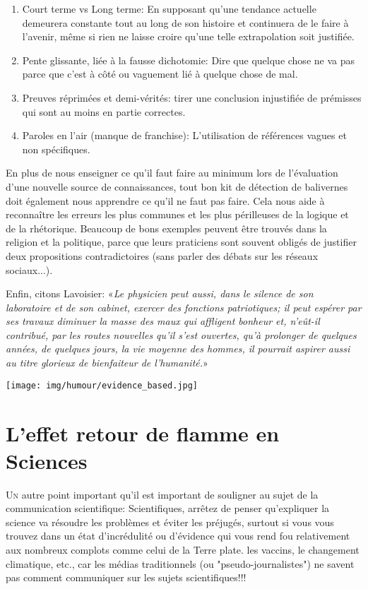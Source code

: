 \begin{enumerate}
		\item Court terme vs Long terme: En supposant qu'une tendance actuelle demeurera constante tout au long de son histoire et continuera de le faire à l'avenir, même si rien ne laisse croire qu'une telle extrapolation soit justifi\'ee.

		\item Pente glissante, li\'ee à la fausse dichotomie: Dire que quelque chose ne va pas parce que c'est à côt\'e ou vaguement li\'e à quelque chose de mal.

		\item Preuves r\'eprim\'ees et demi-v\'erit\'es: tirer une conclusion injustifi\'ee de pr\'emisses qui sont au moins en partie correctes.

		\item Paroles en l'air (manque de franchise): L'utilisation de r\'ef\'erences vagues et non sp\'ecifiques.
	\end{enumerate}
	
	En plus de nous enseigner ce qu'il faut faire au minimum lors de l'\'evaluation d'une nouvelle source de connaissances, tout bon kit de d\'etection de balivernes doit \'egalement nous apprendre ce qu'il ne faut pas faire. Cela nous aide à reconnaître les erreurs les plus communes et les plus p\'erilleuses de la logique et de la rh\'etorique. Beaucoup de bons exemples peuvent être trouv\'es dans la religion et la politique, parce que leurs praticiens sont souvent oblig\'es de justifier deux propositions contradictoires (sans parler des d\'ebats sur les r\'eseaux sociaux...).

	Enfin, citons Lavoisier: «\textit{Le physicien peut aussi, dans le silence de son laboratoire et de son cabinet, exercer des fonctions patriotiques; il peut esp\'erer par ses travaux diminuer la masse des maux qui affligent bonheur et, n'eût-il contribu\'e, par les routes nouvelles qu'il s'est ouvertes, qu'à prolonger de quelques ann\'ees, de quelques jours, la vie moyenne des hommes, il pourrait aspirer aussi au titre glorieux de bienfaiteur de l'humanit\'e.}»
	\begin{center}
		\texttt{[image: img/humour/evidence\_based.jpg]}	
	\end{center}
	
	\pagebreak
	\section{L'effet retour de flamme en Sciences}
	\lettrine[lines=4]{\color{BrickRed}U}n autre point important qu'il est important de souligner au sujet de la communication scientifique: Scientifiques, arrêtez de penser qu'expliquer la science va r\'esoudre les problèmes et \'eviter les pr\'ejug\'es, surtout si vous vous trouvez dans un \'etat d'incr\'edulit\'e ou d'\'evidence qui vous rend fou relativement aux nombreux complots comme celui de la Terre plate. les vaccins, le changement climatique, etc., car les m\'edias traditionnels (ou "pseudo-journalistes") ne savent pas comment communiquer sur les sujets scientifiques!!!

